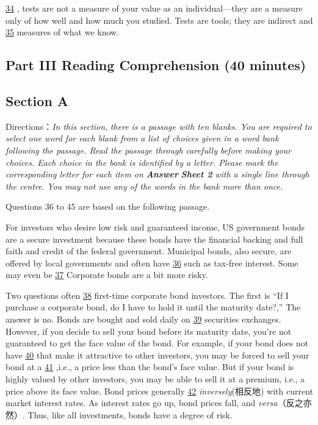 \documentclass[UTF8,11pt]{ctexart}
\begin{document}
\uline{34} , tests are not a measure of your value as an individual—they are a measure only of how well and how much you studied. Tests are tools; they are indirect and \uline{35} measures of what we know.


\subsection*{\textbf{Part} III \textbf{Reading Comprehension} \textbf{(40 minutes)}}


\subsection*{\textbf{Section A}}


Directions：\textit{In this section},\textit{ there is a passage with ten blanks. You are required to select one word for each blank from a} \textit{list of choices given in a word bank following the passage. Read the passage through carefully before making your} \textit{choices. Each choice in the bank is identified by a letter. Please mark the corresponding letter for each item on}\textbf{\textit{ Answer}} \textbf{\textit{Sheet 2}}\textit{ with a single line through the centre}.\textit{ You may not use any of the words in the bank more than once.}


Questions 36 to 45 are based on the following passage.


For investors who desire low risk and guaranteed income, US government bonds are a secure investment because these bonds have the financial backing and full faith and credit of the federal government. Municipal bonds, also secure, are offered by local governments and often have \uline{36} such as tax-free interest. Some may even be \uline{37} Corporate bonds are a bit more risky.


Two questions often \uline{38} first-time corporate bond investors. The first is “If I purchase a corporate bond, do I have to hold it until the maturity date?,” The answer is no. Bonds are bought and sold daily on \uline{39} securities exchanges. However, if you decide to sell your bond before its maturity date, you’re not guaranteed to get the face value of the bond. For example, if your bond does not have \uline{40} that make it attractive to other investors, you may be forced to sell your bond at a \uline{41} ,i.e., a price less than the bond’s face value. But if your bond is highly valued by other investors, you may be able to sell it at a premium, i.e., a price above its face value. Bond prices generally \uline{42} \textit{inversely}(相反地) with current market interest rates. As interest rates go up, bond prices fall, and\textit{ versa}（反之亦然）. Thus, like all investments, bonds have a degree of risk.
\end{document}
